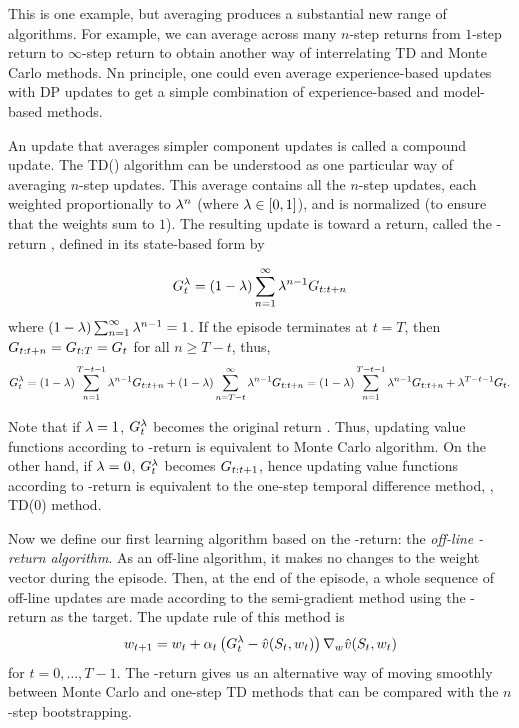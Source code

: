 This is one example, but averaging produces a substantial new range of algorithms.
For example, we can average across many $n$-step returns
from $1$-step return to $\infty$-step return
to obtain another way of interrelating TD and Monte Carlo methods.
Nn principle, one could even average experience-based updates
with DP updates to get a simple combination of experience-based and model-based methods.

An update that averages simpler component updates is called a compound update.
The TD(\tdparam) algorithm can be understood as one particular way of averaging $n$-step updates.
This average contains all the $n$-step updates,
each weighted proportionally to $\lambda^n$ (where $\lambda\in[0,1]$),
and is normalized (to ensure that the weights sum to $1$).
The resulting update is toward a return, called the \tdparam-return , defined in its state-based form by

\begin{equation}
\label{eq:lambda-return}
G^{\lambda}_{t} = (1-\lambda) \sum_{n=1}^\infty \lambda^{n-1} G_{{t}:{t+n}}
\end{equation}
where $(1-\lambda) \sum_{n=1}^\infty \lambda^{n-1} = 1$.
If the episode terminates at $t=T$,
then $G_{{t}:{t+n}} = G_{{t}:{T}} = G_{{t}}$ for all $n \geq T-t$,
thus,
\begin{equation}
G^{\lambda}_{t} = (1-\lambda) \sum_{n=1}^{T-t-1} \lambda^{n-1} G_{{t}:{t+n}}
+ (1-\lambda) \sum_{n=T-t}^\infty \lambda^{n-1} G_{{t}:{t+n}}
= (1-\lambda) \sum_{n=1}^{T-t-1} \lambda^{n-1} G_{{t}:{t+n}}
+ \lambda^{T-t-1} G_{{t}}.
\end{equation}

Note that if $\lambda=1$, $G^{\lambda}_{t}$ becomes the original return .
Thus, updating value functions according to \tdparam-return is equivalent to Monte Carlo algorithm.
On the other hand, if $\lambda=0$,
$G^{\lambda}_{t}$ becomes $G_{{t}:{t+1}}$,
hence updating value functions according to \tdparam-return is equivalent to
the one-step temporal difference method,
\ie, TD($0$) method.

Now we define our first learning algorithm based on the \tdparam-return:
the \emph{off-line \tdparam-return algorithm}.
As an off-line algorithm,
it makes no changes to the weight vector during the episode.
Then, at the end of the episode,
a whole sequence of off-line updates are made according
to the semi-gradient method
using the \tdparam-return as the target.
The update rule of this method is
\begin{equation}
\label{eq:off-line-lambda-return-update}
{w_{t+1}} = {w_{t}}
+ \alpha_{t} \left( G^{\lambda}_{t} - \hat{v}(S_{t}, {w_{t}})
\right) \nabla_{{w_{}}} \hat{v}(S_{t}, {w_{t}})
\end{equation}
for $t=0,\ldots, T-1$.
The \tdparam-return gives us
an alternative way of moving smoothly
between Monte Carlo and one-step TD methods
that can be compared with the $n$-step bootstrapping.

